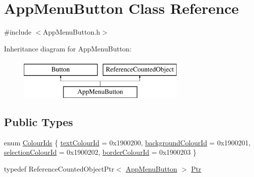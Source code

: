 \hypertarget{classAppMenuButton}{}\section{App\+Menu\+Button Class Reference}
\label{classAppMenuButton}


{\ttfamily \#include $<$App\+Menu\+Button.\+h$>$}

Inheritance diagram for App\+Menu\+Button\+:\begin{figure}[H]
\begin{center}
\leavevmode
\includegraphics[height=2.000000cm]{classAppMenuButton}
\end{center}
\end{figure}
\subsection*{Public Types}
\begin{DoxyCompactItemize}
\item 
enum \mbox{\hyperlink{classAppMenuButton_a9c81c78f6797058581b02308e25021f9}{Colour\+Ids}} \{ \mbox{\hyperlink{classAppMenuButton_a9c81c78f6797058581b02308e25021f9a4837ae0581b3de7a3dce1c1a05abc08c}{text\+Colour\+Id}} = 0x1900200, 
\mbox{\hyperlink{classAppMenuButton_a9c81c78f6797058581b02308e25021f9aaf3eb1c5718cdafded022d9d3b4a573d}{background\+Colour\+Id}} = 0x1900201, 
\mbox{\hyperlink{classAppMenuButton_a9c81c78f6797058581b02308e25021f9ae604b421b06927745c38a5c56b4e0b61}{selection\+Colour\+Id}} = 0x1900202, 
\mbox{\hyperlink{classAppMenuButton_a9c81c78f6797058581b02308e25021f9a1b502c02e063c24793abb78d347a5872}{border\+Colour\+Id}} = 0x1900203
 \}
\item 
typedef Reference\+Counted\+Object\+Ptr$<$ \mbox{\hyperlink{classAppMenuButton}{App\+Menu\+Button}} $>$ \mbox{\hyperlink{classAppMenuButton_aeb692efb6a933970de8eac14e5e71544}{Ptr}}
\end{DoxyCompactItemize}
